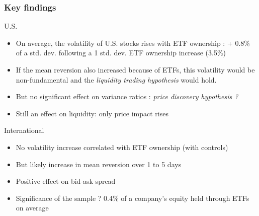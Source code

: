 \documentclass[9pt, usenames, dvipsnames]{beamer}
\begin{document}
\begin{frame}
  \frametitle{Key findings}
  \begin{block}{U.S.}
  \begin{itemize}
  \item On average, the volatility of U.S. stocks rises with ETF ownership : + 0.8\% of a std. dev. following a 1 std. dev. ETF ownership increase (3.5\%)
  \item If the mean reversion also increased because of ETFs, this volatility would be non-fundamental and the \emph{liquidity trading hypothesis} would hold.
  \item But no significant effect on variance ratios : \emph{price discovery hypothesis ?}
  \item Still an effect on liquidity: only price impact rises
  \end{itemize}
  \end{block}
  \begin{block}{International}
    \begin{itemize}
    \item No volatility increase correlated with ETF ownership (with controls)
      \item But likely increase in mean reversion over 1 to 5 days
      \item Positive effect on bid-ask spread
      \item Significance of the sample ? 0.4\% of a company's equity held through ETFs on average
    \end{itemize}
  \end{block}
\end{frame}
\end{document}
